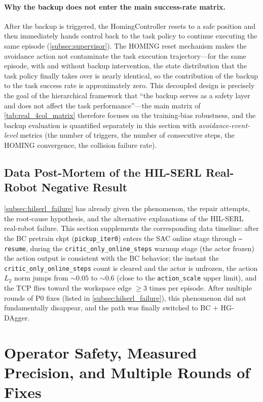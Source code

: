\paragraph{Why the backup does not enter the main success-rate matrix.} After the backup is triggered, the HomingController resets to a safe position and then immediately hands control back to the task policy to continue executing the same episode (\cref{subsec:supervisor}). The HOMING reset mechanism makes the avoidance action not contaminate the task execution trajectory---for the same episode, with and without backup intervention, the state distribution that the task policy finally takes over is nearly identical, so the contribution of the backup to the task success rate is approximately zero. This decoupled design is precisely the goal of the hierarchical framework that ``the backup serves as a safety layer and does not affect the task performance''---the main matrix of \cref{tab:real_4col_matrix} therefore focuses on the training-bias robustness, and the backup evaluation is quantified separately in this section with \emph{avoidance-event-level} metrics (the number of triggers, the number of consecutive steps, the HOMING convergence, the collision failure rate).

\subsection{Data Post-Mortem of the HIL-SERL Real-Robot Negative Result}\label{subsec:exp_hilserl_failure}

\cref{subsec:hilserl_failure} has already given the phenomenon, the repair attempts, the root-cause hypothesis, and the alternative explanations of the HIL-SERL real-robot failure. This section supplements the corresponding data timeline: after the BC pretrain ckpt (\texttt{pickup\_iter0}) enters the SAC online stage through \texttt{--resume}, during the \texttt{critic\_only\_online\_steps} warmup stage (the actor frozen) the action output is consistent with the BC behavior; the instant the \texttt{critic\_only\_online\_steps} count is cleared and the actor is unfrozen, the action $L_2$ norm jumps from $\sim 0.05$ to $\sim 0.6$ (close to the \texttt{action\_scale} upper limit), and the TCP flies toward the workspace edge $\geq 3$ times per episode. After multiple rounds of P0 fixes (listed in \cref{subsec:hilserl_failure}), this phenomenon did not fundamentally disappear, and the path was finally switched to BC $+$ HG-DAgger.

\section{Operator Safety, Measured Precision, and Multiple Rounds of Fixes}\label{sec:operator_safety}

